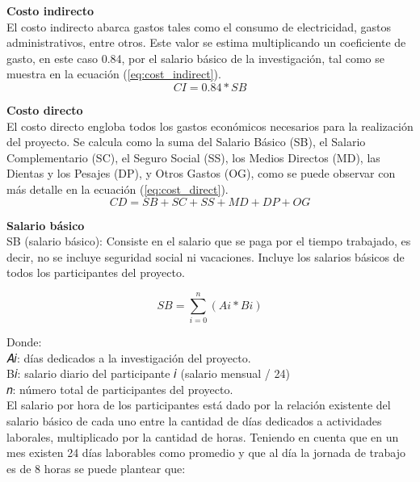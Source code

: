 \textbf{Costo indirecto}\\
El costo indirecto abarca gastos tales como el consumo de electricidad, gastos administrativos, entre otros.
Este valor se estima multiplicando un coeficiente de gasto, en este caso 0.84, por el salario básico de la
investigación, tal como se muestra en la ecuación (\ref{eq:cost_indirect}). \\

\begin{equation}
    \label{eq:cost_indirect}
    CI = 0.84 * SB
\end{equation}

\textbf{Costo directo}\\
El costo directo engloba todos los gastos económicos necesarios para la realización del proyecto. Se
calcula como la suma del Salario Básico (SB), el Salario Complementario (SC), el Seguro Social (SS), los
Medios Directos (MD), las Dientas y los Pesajes (DP), y Otros Gastos (OG), como se puede observar con más
detalle en la ecuación (\ref{eq:cost_direct}). \\

\begin{equation}
    \label{eq:cost_direct}
    CD = SB + SC + SS + MD + DP + OG
\end{equation}

\textbf{Salario básico}\\
SB (salario básico): Consiste en el salario que se paga por el tiempo trabajado, es decir, no se incluye seguridad social ni vacaciones. Incluye los salarios básicos de todos los participantes del proyecto.


\begin{equation}
    \label{eq:sal_basico}
    SB = \sum_{i = 0}^{n} (Ai * Bi)
\end{equation}

Donde:\\
𝐴𝑖: días dedicados a la investigación del proyecto.\\
B𝑖: salario diario del participante 𝑖 (salario mensual / 24)\\
𝑛: número total de participantes del proyecto.\\

El salario por hora de los participantes está dado por la relación existente del salario
básico de cada uno entre la cantidad de días dedicados a actividades laborales,
multiplicado por la cantidad de horas. Teniendo en cuenta que en un mes existen 24
días laborables como promedio y que al día la jornada de trabajo es de 8 horas se
puede plantear que:

